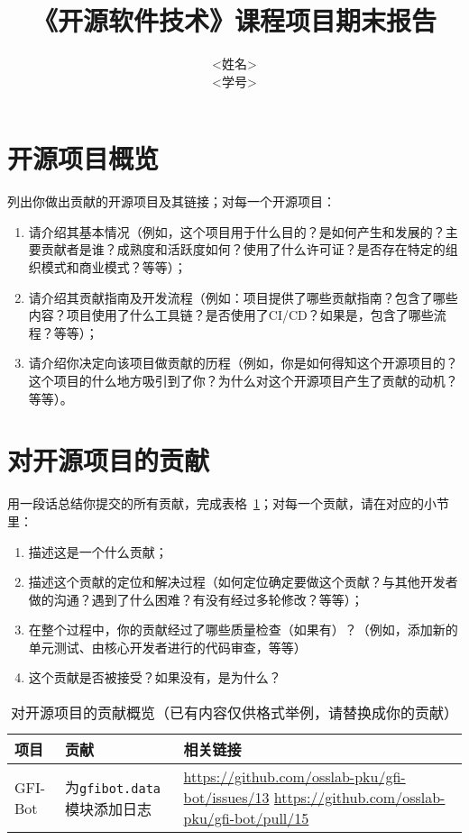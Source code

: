 \documentclass[lang=cn,11pt,a4paper,cite=authoryear]{elegantpaper}
\title{《开源软件技术》课程项目期末报告}
\author{
<姓名>\\<学号>\\\email{xxxxx@pku.edu.cn}
}
\date{}
\begin{document}
\maketitle

\section{开源项目概览}

\begin{tcolorbox}[title=\textbf{请在这一节包含如下内容：},colback=yellow!10!white]
  列出你做出贡献的开源项目及其链接；对每一个开源项目：
  \begin{enumerate}
    \item 请介绍其基本情况（例如，这个项目用于什么目的？是如何产生和发展的？主要贡献者是谁？成熟度和活跃度如何？使用了什么许可证？是否存在特定的组织模式和商业模式？等等）；
    \item 请介绍其贡献指南及开发流程（例如：项目提供了哪些贡献指南？包含了哪些内容？项目使用了什么工具链？是否使用了CI/CD？如果是，包含了哪些流程？等等）；
    \item 请介绍你决定向该项目做贡献的历程（例如，你是如何得知这个开源项目的？这个项目的什么地方吸引到了你？为什么对这个开源项目产生了贡献的动机？等等）。
  \end{enumerate}
\end{tcolorbox}

\section{对开源项目的贡献}

\begin{tcolorbox}[title=\textbf{请在这一节包含如下内容：},colback=yellow!10!white]
用一段话总结你提交的所有贡献，完成表格~\ref{tab:contrib}；对每一个贡献，请在对应的小节里：
\begin{enumerate}
    \item 描述这是一个什么贡献；
    \item 描述这个贡献的定位和解决过程（如何定位确定要做这个贡献？与其他开发者做的沟通？遇到了什么困难？有没有经过多轮修改？等等）；
    \item 在整个过程中，你的贡献经过了哪些质量检查（如果有）？（例如，添加新的单元测试、由核心开发者进行的代码审查，等等）
    \item 这个贡献是否被接受？如果没有，是为什么？
\end{enumerate}
\end{tcolorbox}

\begin{table}[]
    \centering
    \caption{对开源项目的贡献概览（已有内容仅供格式举例，请替换成你的贡献）}
    \begin{tabular}{llp{9cm}}
      \toprule
        项目 & 贡献 & 相关链接 \\
      \midrule
        GFI-Bot & 为\texttt{gfibot.data}模块添加日志 & \url{https://github.com/osslab-pku/gfi-bot/issues/13} \newline \url{https://github.com/osslab-pku/gfi-bot/pull/15}\\ 
      \bottomrule
    \end{tabular}
    \label{tab:contrib}
\end{table}
\end{document}
